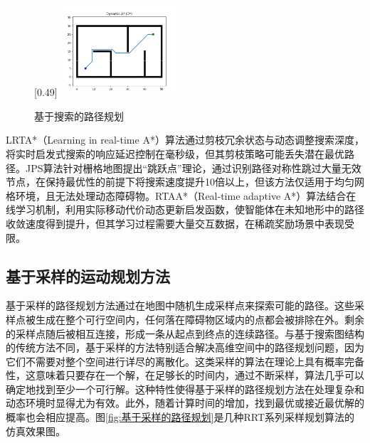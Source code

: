 \documentclass[master,academic]{ysuthesis} %
\begin{document}
\begin{figure}[!ht]
			[0.49\textwidth]{\includegraphics[width=0.4\textwidth]{fig/插图/A-search/Dstar.png}}
			\caption{基于搜索的路径规划}
			\label{fig:基于搜索的路径规划}
		\end{figure}

		LRTA*（Learning in real-time A*）算法通过剪枝冗余状态与动态调整搜索深度，将实时启发式搜索的响应延迟控制在毫秒级，但其剪枝策略可能丢失潜在最优路径。JPS算法针对栅格地图提出“跳跃点”理论，通过识别路径对称性跳过大量无效节点，在保持最优性的前提下将搜索速度提升10倍以上，但该方法仅适用于均匀网格环境，且无法处理动态障碍物。RTAA*（Real-time adaptive A*）算法结合在线学习机制，利用实际移动代价动态更新启发函数，使智能体在未知地形中的路径收敛速度得到提升，但其学习过程需要大量交互数据，在稀疏奖励场景中表现受限。

		\subsection{基于采样的运动规划方法}
		基于采样的路径规划方法通过在地图中随机生成采样点来探索可能的路径。这些采样点被生成在整个可行空间内，任何落在障碍物区域内的点都会被排除在外。剩余的采样点随后被相互连接，形成一条从起点到终点的连续路径。与基于搜索图结构的传统方法不同，基于采样的方法特别适合解决高维空间中的路径规划问题，因为它们不需要对整个空间进行详尽的离散化。这类采样的算法在理论上具有概率完备性，这意味着只要存在一个解，在足够长的时间内，通过不断采样，算法几乎可以确定地找到至少一个可行解。这种特性使得基于采样的路径规划方法在处理复杂和动态环境时显得尤为有效。此外，随着计算时间的增加，找到最优或接近最优解的概率也会相应提高。图\ref{fig:基于采样的路径规划}是几种RRT系列采样规划算法的仿真效果图。
\end{document}
